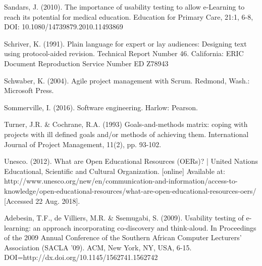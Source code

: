 \begin{thebibliography}{69}
	 Sandars, J. (2010). The importance of usability testing to allow e-Learning to reach its potential for medical education. Education for Primary Care, 21:1, 6-8, DOI: 10.1080/14739879.2010.11493869
  
	 Schriver, K. (1991). Plain language for expert or lay audiences: Designing text using protocol-aided revision. Technical Report Number 46. California: ERIC Document Reproduction Service Number ED Z78943
	
     Schwaber, K. (2004). Agile project management with Scrum. Redmond, Wash.: Microsoft Press.
    
     Sommerville, I. (2016). Software engineering. Harlow: Pearson.

     Turner, J.R. \& Cochrane, R.A. (1993) Goals-and-methods matrix: coping with projects with ill defined goals and/or methods of achieving them. International Journal of Project Management, 11(2), pp. 93-102.
  
     Unesco. (2012). What are Open Educational Resources (OERs)? | United Nations Educational, Scientific and Cultural Organization. [online] Available at: http://www.unesco.org/new/en/communication-and-information/access-to-knowledge/open-educational-resources/what-are-open-educational-resources-oers/ [Accessed 22 Aug. 2018].
 
	 Adebesin, T.F., de Villiers, M.R. \& Ssemugabi, S. (2009). Usability testing of e-learning: an approach incorporating co-discovery and think-aloud. In Proceedings of the 2009 Annual Conference of the Southern African Computer Lecturers' Association (SACLA '09). ACM, New York, NY, USA, 6-15. DOI=http://dx.doi.org/10.1145/1562741.1562742   

\end{thebibliography}


